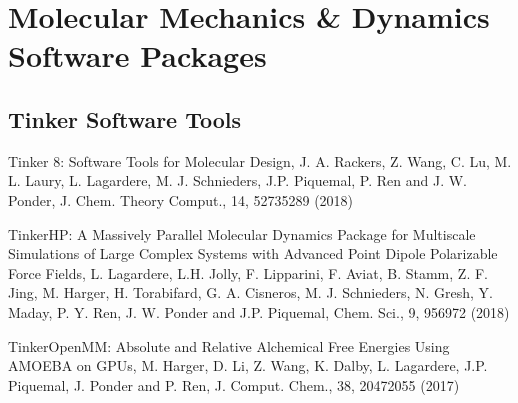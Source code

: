 \documentclass[letterpaper,11pt,english]{sphinxmanual}
\begin{document}
\section{Molecular Mechanics \& Dynamics Software Packages}
\label{\detokenize{text/references:molecular-mechanics-dynamics-software-packages}}

\subsection{Tinker Software Tools}
\label{\detokenize{text/references:tinker-software-tools}}
\sphinxAtStartPar
{}

\sphinxAtStartPar
Tinker 8: Software Tools for Molecular Design, J. A. Rackers, Z. Wang, C. Lu, M. L. Laury, L. Lagardere, M. J. Schnieders, J.\sphinxhyphen{}P. Piquemal, P. Ren and J. W. Ponder, J. Chem. Theory Comput., 14, 5273\sphinxhyphen{}5289 (2018)

\sphinxAtStartPar
{}

\sphinxAtStartPar
Tinker\sphinxhyphen{}HP: A Massively Parallel Molecular Dynamics Package for Multiscale Simulations of Large Complex Systems with Advanced Point Dipole Polarizable Force Fields, L. Lagardere, L.\sphinxhyphen{}H. Jolly, F. Lipparini, F. Aviat, B. Stamm, Z. F. Jing, M. Harger, H. Torabifard, G. A. Cisneros, M. J. Schnieders, N. Gresh, Y. Maday, P. Y. Ren, J. W. Ponder and J.\sphinxhyphen{}P. Piquemal, Chem. Sci., 9, 956\sphinxhyphen{}972 (2018)

\sphinxAtStartPar
{}

\sphinxAtStartPar
Tinker\sphinxhyphen{}OpenMM: Absolute and Relative Alchemical Free Energies Using AMOEBA on GPUs, M. Harger, D. Li, Z. Wang, K. Dalby, L. Lagardere, J.\sphinxhyphen{}P. Piquemal, J. Ponder and P. Ren, J. Comput. Chem., 38, 2047\sphinxhyphen{}2055 (2017)
\end{document}
